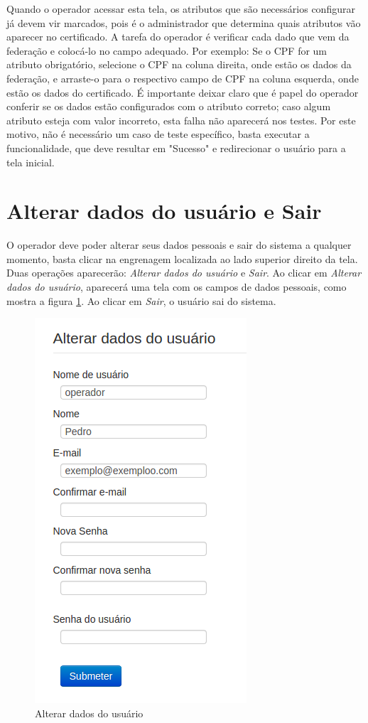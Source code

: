 Quando o operador acessar esta tela, os atributos que são necessários configurar já devem vir marcados, pois é o administrador que determina quais atributos vão aparecer no certificado. A tarefa do operador é verificar cada dado que vem da federação e colocá-lo no campo adequado. Por exemplo: Se o CPF for um atributo obrigatório, selecione o CPF na coluna direita, onde estão os dados da federação, e arraste-o para o respectivo campo de CPF na coluna esquerda, onde estão os dados do certificado. É importante deixar claro que é papel do operador conferir se os dados estão configurados com o atributo correto; caso algum atributo esteja com valor incorreto, esta falha não aparecerá nos testes. Por este motivo, não é necessário um caso de teste específico, basta executar a funcionalidade, que deve resultar em "Sucesso" e redirecionar o usuário para a tela inicial.

\section{Alterar dados do usuário e Sair}

O operador deve poder alterar seus dados pessoais e sair do sistema a qualquer momento, basta clicar na engrenagem localizada ao lado superior direito da tela. Duas operações aparecerão: \textit{Alterar dados do usuário} e \textit{Sair}. Ao clicar em \textit{Alterar dados do usuário}, aparecerá uma tela com os campos de dados pessoais, como mostra a figura \ref{fig:alterarop}. Ao clicar em \textit{Sair}, o usuário sai do sistema.

\begin{figure}[ht]
    \centering
     \includegraphics[scale=0.7]{images/alterardadosop.png}
     \caption{Alterar dados do usuário}
     \label{fig:alterarop}
\end{figure}

